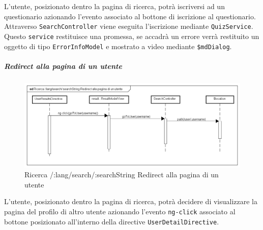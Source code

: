 L'utente, posizionato dentro la pagina di ricerca, potrà iscriversi ad un questionario azionando l'evento associato al bottone di iscrizione al questionario. Attraverso \texttt{SearchController} viene eseguita l'iscrizione mediante \texttt{QuizService}. Questo \texttt{service} restituisce una promessa, se accadrà un errore verrà restituito un oggetto di tipo \texttt{ErrorInfoModel} e mostrato a video mediante \texttt{\$mdDialog}.


\subparagraph{Redirect alla pagina di un utente}

\label{Ricerca /:lang/search/:searchString Redirect alla pagina di un utente}

\begin{figure}[ht]
	\centering
	\includegraphics[scale=0.5,keepaspectratio]{UML/DiagrammiDiSequenza/Front-End/Search_goToUser.png}
	\caption{Ricerca /:lang/search/:searchString Redirect alla pagina di un utente}
\end{figure} \FloatBarrier

L'utente, posizionato dentro la pagina di ricerca, potrà decidere di visualizzare la pagina del profilo di altro utente azionando l'evento \texttt{ng-click} associato al bottone posizionato all'interno della directive \texttt{UserDetailDirective}.